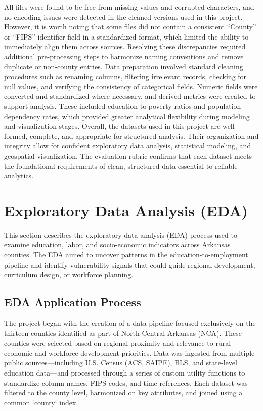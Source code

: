 \documentclass[12pt]{llncs}
\begin{document}
All files were found to be free from missing values and corrupted characters, and no encoding issues were detected in the cleaned versions used in this project. However, it is worth noting that some files did not contain a consistent “County” or “FIPS” identifier field in a standardized format, which limited the ability to immediately align them across sources. Resolving these discrepancies required additional pre-processing steps to harmonize naming conventions and remove duplicate or non-county entries.
Data preparation involved standard cleaning procedures such as renaming columns, filtering irrelevant records, checking for null values, and verifying the consistency of categorical fields. Numeric fields were converted and standardized where necessary, and derived metrics were created to support analysis. These included education-to-poverty ratios and population dependency rates, which provided greater analytical flexibility during modeling and visualization stages.
Overall, the datasets used in this project are well-formed, complete, and appropriate for structured analysis. Their organization and integrity allow for confident exploratory data analysis, statistical modeling, and geospatial visualization. The evaluation rubric confirms that each dataset meets the foundational requirements of clean, structured data essential to reliable analytics.

\section{Exploratory Data Analysis (EDA)}

This section describes the exploratory data analysis (EDA) process used to examine education, labor, and socio-economic indicators across Arkansas counties. The EDA aimed to uncover patterns in the education-to-employment pipeline and identify vulnerability signals that could guide regional development, curriculum design, or workforce planning.

\subsection*{EDA Application Process}

The project began with the creation of a data pipeline focused exclusively on the thirteen counties identified as part of North Central Arkansas (NCA). These counties were selected based on regional proximity and relevance to rural economic and workforce development priorities. Data was ingested from multiple public sources—including U.S. Census (ACS, SAIPE), BLS, and state-level education data—and processed through a series of custom utility functions to standardize column names, FIPS codes, and time references. Each dataset was filtered to the county level, harmonized on key attributes, and joined using a common `county` index.
\end{document}

